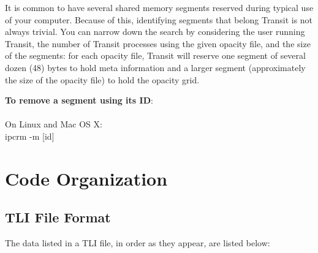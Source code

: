\documentclass[letterpaper, 12pt]{article}
\begin{document}
\medskip
It is common to have several shared memory segments reserved during typical
use of your computer. Because of this, identifying segments that belong
Transit is not always trivial. You can narrow down the search by considering
the user running Transit, the number of Transit processes using the given
opacity file, and the size of the segments: for each opacity file, Transit
will reserve one segment of several dozen (48) bytes to hold meta information
and a larger segment (approximately the size of the opacity file) to hold
the opacity grid. \newline

\noindent
{\bf To remove a segment using its ID}: \\
\\
On Linux and Mac OS X: \\
{\tttm ipcrm -m [id]} \\


\section{Code Organization}
\label{sec:organization}


\subsection{TLI File Format}

The data listed in a TLI file, in order as they appear, are listed below:
\end{document}

